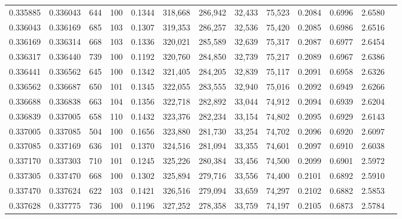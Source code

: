 \begin{tabular}{rrrrrrrrrrrrr}
0.335885 & 0.336043 &   644 & 100 &                                     0.1344 & 318,668 & 286,942 &  32,433 &  75,523 & 0.2084 & 0.6996 & 2.6580 \\
0.336043 & 0.336169 &   685 & 103 &                                     0.1307 & 319,353 & 286,257 &  32,536 &  75,420 & 0.2085 & 0.6986 & 2.6516 \\
0.336169 & 0.336314 &   668 & 103 &                                     0.1336 & 320,021 & 285,589 &  32,639 &  75,317 & 0.2087 & 0.6977 & 2.6454 \\
0.336317 & 0.336440 &   739 & 100 &                                     0.1192 & 320,760 & 284,850 &  32,739 &  75,217 & 0.2089 & 0.6967 & 2.6386 \\
0.336441 & 0.336562 &   645 & 100 &                                     0.1342 & 321,405 & 284,205 &  32,839 &  75,117 & 0.2091 & 0.6958 & 2.6326 \\
0.336562 & 0.336687 &   650 & 101 &                                     0.1345 & 322,055 & 283,555 &  32,940 &  75,016 & 0.2092 & 0.6949 & 2.6266 \\
0.336688 & 0.336838 &   663 & 104 &                                     0.1356 & 322,718 & 282,892 &  33,044 &  74,912 & 0.2094 & 0.6939 & 2.6204 \\
0.336839 & 0.337005 &   658 & 110 &                                     0.1432 & 323,376 & 282,234 &  33,154 &  74,802 & 0.2095 & 0.6929 & 2.6143 \\
0.337005 & 0.337085 &   504 & 100 &                                     0.1656 & 323,880 & 281,730 &  33,254 &  74,702 & 0.2096 & 0.6920 & 2.6097 \\
0.337085 & 0.337169 &   636 & 101 &                                     0.1370 & 324,516 & 281,094 &  33,355 &  74,601 & 0.2097 & 0.6910 & 2.6038 \\
0.337170 & 0.337303 &   710 & 101 &                                     0.1245 & 325,226 & 280,384 &  33,456 &  74,500 & 0.2099 & 0.6901 & 2.5972 \\
0.337305 & 0.337470 &   668 & 100 &                                     0.1302 & 325,894 & 279,716 &  33,556 &  74,400 & 0.2101 & 0.6892 & 2.5910 \\
0.337470 & 0.337624 &   622 & 103 &                                     0.1421 & 326,516 & 279,094 &  33,659 &  74,297 & 0.2102 & 0.6882 & 2.5853 \\
0.337628 & 0.337775 &   736 & 100 &                                     0.1196 & 327,252 & 278,358 &  33,759 &  74,197 & 0.2105 & 0.6873 & 2.5784 \\

\end{tabular}
